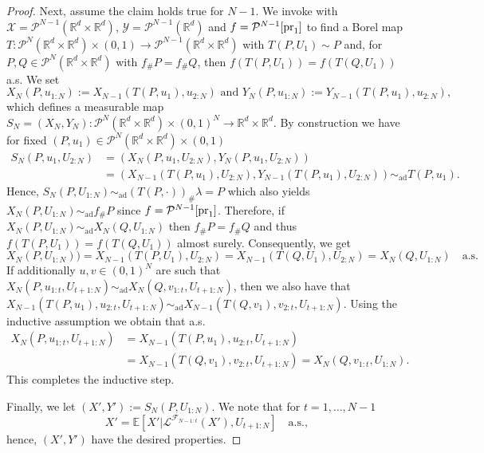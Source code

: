 \documentclass[a4paper]{amsart}
\numberwithin{theorem}{section}
\theoremstyle{definition}
\newcommand{\R}{\mathbb{R}}
\newcommand{\E}{\mathbb{E}}
\newcommand{\F}{\mathcal{F}}
\newcommand{\pr}{\textup{pr}}
\newcommand{\law}{\mathcal{L}}
\newcommand{\Pc}{\mathcal P}
\newcommand{\simad}{\sim_{\mathrm{ad}}}
\begin{document}
\begin{proof}
    Next, assume the claim holds true for $N - 1$.
    We invoke  with $\mathcal X = \mathcal P^{N-1}(\R^d \times \R^d)$, $\mathcal Y = \mathcal P^{N-1}(\R^d)$ and $f = \mathcal P^{N-1}[\pr_1]$ to find a Borel map $T : \Pc^N(\R^d \times \R^d) \times (0,1) \to \Pc^{N-1}(\R^d \times \R^d)$ with $T(P,U_1) \sim P$ and, for $P,Q \in \Pc^N(\R^d \times \R^d)$ with $f_\# P = f_\# Q$, then $f(T(P,U_1)) = f(T(Q,U_1))$ a.s.
    We set
    \[
        X_N(P,u_{1:N}) := X_{N-1}(T(P,u_1),u_{2:N}) \text{ and }
        Y_N(P,u_{1:N}) := Y_{N-1}(T(P,u_1),u_{2:N}),
    \]
    which defines a measurable map $S_N = (X_N,Y_N) : \Pc^N(\R^d \times \R^d) \times (0,1)^N \to \R^d \times \R^d$.
    By construction we have for fixed $(P,u_1) \in \Pc^N(\R^d \times \R^d) \times (0,1)$
    \begin{align*}
        S_N(P,u_1,U_{2:N}) &= (X_N(P,u_1,U_{2:N}), Y_N(P,u_1,U_{2:N})) \\ 
        &= (X_{N-1}(T(P,u_1),U_{2:N}), Y_{N-1}(T(P,u_1),U_{2:N})) \simad T(P,u_1).
    \end{align*}
    Hence, $S_N(P,U_{1:N}) \simad (T(P,\cdot))_\# \lambda = P$ which also yields $X_N(P,U_{1:N}) \simad f_\# P$ since $f = \Pc^{N-1}[\pr_1]$.
    Therefore, if $X_N(P,U_{1:N}) \simad X_N(Q,U_{1:N})$ then $f_\# P = f_\# Q$ and thus $f(T(P,U_1)) = f(T(Q,U_1))$ almost surely.
    Consequently, we get
    \[
        X_N(P,U_{1:N})) = X_{N-1}(T(P,U_1),U_{2:N}) = X_{N-1}(T(Q,U_1),U_{2:N}) = X_N(Q,U_{1:N}) \quad\text{a.s.}
    \]
    If additionally $u,v \in (0,1)^N$ are such that $X_N(P,u_{1:t},U_{t+1:N}) \simad X_N(Q,v_{1:t},U_{t+1:N})$, then we also have that $X_{N-1}(T(P,u_1),u_{2:t},U_{t + 1:N}) \simad X_{N-1}(T(Q,v_1),v_{2:t},U_{t + 1:N})$.
    Using the inductive assumption we obtain that a.s.
    \begin{align*}
        X_N(P,u_{1:t},U_{t+1:N}) &= X_{N-1}(T(P,u_1),u_{2:t},U_{t+1:N}) \\
        &= X_{N-1}(T(Q,v_1),v_{2:t},U_{t+1:N}) = X_N(Q,v_{1:t}, U_{1:N}).  
    \end{align*}
    This completes the inductive step.

    Finally, we let $(X',Y') :=  S_N(P,U_{1:N})$. We note that for $t = 1,\dots, N-1$
    \[
        X' = \E[ X' | \law^{\F_{N-1:t}}(X'),U_{t+1:N}] \quad\text{a.s.},
    \]
    hence, $(X',Y')$ have the desired properties.
\end{proof}
\end{document}
